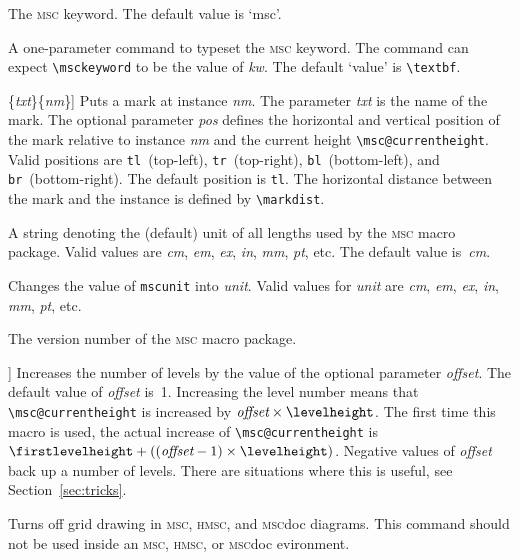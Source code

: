 \documentclass[a4paper]{article}
\newcommand{\cmd}[1]{\texttt{\bslash #1}}
\newcommand{\acro}[1]{{\scshape\lowercase{#1}}}
\newcommand\MSC{\acro{MSC}}
\newcommand\HMSC{\acro{HMSC}}
\newcommand{\MSCdoc}{\MSC{}doc}
\newcommand{\mscpack}{\MSC{} macro package}
\newcommand{\opt}[1]{[#1]}
\newenvironment{defs}{%
  \begin{list}{}%
              {\setlength{\labelwidth}{0pt}%
               \setlength{\labelsep}{1em}%
               \setlength{\leftmargin}{1em}%
               \setlength{\parsep}{1ex}%
               \setlength{\listparindent}{0pt}%
               \setlength{\rightmargin}{0pt}%
               \renewcommand{\makelabel}[1]{##1}%
               \raggedright%
              }%
  }{%
  \end{list}}
\begin{document}
\begin{defs}
\item[\cmd{msckeyword}] The \MSC{} keyword. The default value is `msc'.

\item[\cmd{msckeywordstyle}\{\emph{kw}\}] A one-parameter command to
typeset the \MSC{} keyword. The command can expect \verb|\msckeyword| to
be the value of \emph{kw}. The default `value' is \verb|\textbf|.

\item[\cmd{mscmark}\opt{\emph{pos}}\{\emph{txt}\}\{\emph{nm}\}] Puts a
mark at instance \emph{nm}. The parameter \emph{txt} is the name of
the mark. The optional parameter \emph{pos} defines the horizontal and
vertical position of the mark relative to instance \emph{nm} and the
current height \verb|\msc@currentheight|. Valid positions are
\verb|tl|~(top-left), \verb|tr|~(top-right), \verb|bl|~(bottom-left),
and \verb|br|~(bottom-right). The default position is \verb|tl|. The
horizontal distance between the mark and the instance is defined by
\verb+\markdist+.

\item[\cmd{mscunit}] A string denoting the (default) unit of all
lengths used by the \mscpack. Valid values are \emph{cm},
\emph{em}, \emph{ex}, \emph{in}, \emph{mm}, \emph{pt}, etc. The
default value is~\emph{cm}.

\item[\cmd{setmscunit}\{\emph{unit}\}] Changes the value of
\cmd{mscunit} into \emph{unit}. Valid values for \emph{unit} are
\emph{cm}, \emph{em}, \emph{ex}, \emph{in}, \emph{mm}, \emph{pt}, etc.

\item[\cmd{mscversion}] The version number of the \mscpack.

\item[\cmd{nextlevel}\opt{\emph{offset}}] Increases the number of
levels by the value of the optional parameter \emph{offset}. The
default value of \emph{offset} is~1. Increasing the level number means
that \verb|\msc@currentheight| is increased by $\textit{offset} \times
\verb|\levelheight|$. The first time this macro is used, the actual
increase of \verb|\msc@currentheight| is $\verb|\firstlevelheight| +
((\textit{offset} - 1) \times \verb|\levelheight|)$. Negative values
of \emph{offset} back up a number of levels. There are situations
where this is useful, see Section~\ref{sec:tricks}.

\item[\cmd{nogrid}] Turns off grid drawing in \MSC, \HMSC, and
\MSCdoc{} diagrams. This command should not be used inside an \MSC,
\HMSC, or \MSCdoc{} evironment.


\end{defs}
\end{document}
